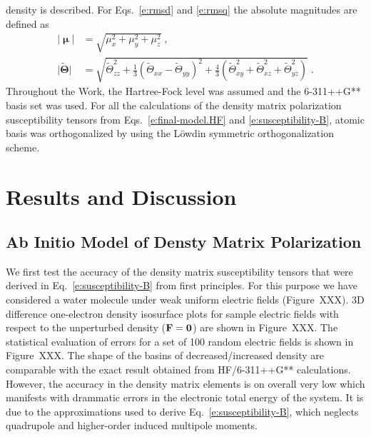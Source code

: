 \documentclass[aip,graphicx]{revtex4-1}
\newcommand{\BM}[1]{\bm{#1}}
\begin{document}
density is described. For Eqs.~\eqref{e:rmsd} and \eqref{e:rmsq} the absolute magnitudes
are defined as
%
\begin{subequations}\label{e:absmagn}
  \begin{align}
   \lvert {\BM\upmu} \rvert &= \sqrt{\mu_x^2+\mu_y^2+\mu_z^2} \;,\\
   \lvert {\widetilde{\BM\Theta}}\rvert &= 
          \sqrt{\widetilde{\Theta}_{zz}^2 + \frac{1}{3}\left(\widetilde{\Theta}_{xx}-\widetilde{\Theta}_{yy}\right)^2 
          + \frac{4}{3}\left( \widetilde{\Theta}_{xy}^2 + \widetilde{\Theta}_{xz}^2 + \widetilde{\Theta}_{yz}^2 \right)} \;. 
  \end{align}
\end{subequations}
%
Throughout the Work, the Hartree\hyp{}Fock level was assumed and the 6-311++G** basis set
was used. For all the calculations of the density matrix polarization susceptibility tensors
from Eqs.~\eqref{e:final-model.HF} and \eqref{e:susceptibility-B}, 
atomic basis was orthogonalized by using the L{\"o}wdin symmetric orthogonalization scheme.


\section{\label{s:4}Results and Discussion}

\subsection{Ab Initio Model of Densty Matrix Polarization}

We first test the accuracy of the density matrix susceptibility tensors that were derived
in Eq.~\eqref{e:susceptibility-B} from first principles. 
For this purpose we have considered a water molecule 
under weak uniform electric fields (Figure~XXX). 
3D difference one\hyp{}electron density isosurface plots for sample electric fields
with respect to the unperturbed density (${\bf F} = {\bf 0}$)
are shown in Figure~XXX. The statistical evaluation of errors for a set of
100 random electric fields is shown in Figure~XXX. The shape of the basins 
of decreased/increased density are comparable with the exact result
obtained from HF/6-311++G** calculations. 
However, the accuracy in the density matrix elements is on overall very low which 
manifests with drammatic errors in the electronic total energy of the system.
It is due to the approximations used to derive Eq.~\eqref{e:susceptibility-B},
which neglects quadrupole and higher\hyp{}order induced multipole moments.
\end{document}
